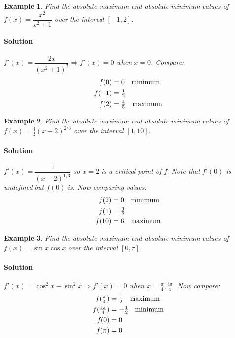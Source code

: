 \documentclass[letterpaper, 11pt, openany]{book}
\theoremstyle{mytheoremstyle}
\theoremstyle{myexamplestyle}
\newtheorem{example}{Example}[section]
\newenvironment{solution}{\paragraph{\sffamily \smaller \fontseries{b}\selectfont Solution}}{\hfill\faSquare}
\begin{document}
\begin{example}\label{absmaxmin-rational}
    Find the absolute maximum and absolute minimum values of $f(x) = \dfrac{x^{2}}{x^{2}+1}$ over the interval $[-1, 2]$.
    \begin{solution}
        $f'(x) = \dfrac{2x}{(x^{2}+ 1)^{2}} \Rightarrow f'(x) = 0$ when $x=0$. Compare:
        \begin{align*}
            f(0) &= 0\text{\quad minimum}\\
            f(-1) &= \tfrac{1}{2}\\
            f(2) &= \tfrac{4}{5}\text{\quad maximum}
        \end{align*}
    \end{solution}
\end{example}

\begin{example}\label{absmaxmin-cuberoot}
    Find the absolute maximum and absolute minimum values of $f(x) = \frac{3}{2} (x-2)^{2/3}$ over the interval $[1, 10]$.
    \begin{solution}
        $f'(x) = \dfrac{1}{(x-2)^{1/3}}$ so $x=2$ is a critical point of $f$. Note that $f'(0)$ is undefined but $f(0)$ is. Now comparing values:
        \begin{align*}
            f(2) &= 0 \text{\quad minimum}\\
            f(1) &= \tfrac{3}{2} \\
            f(10) &= 6 \text{\quad maximum}
        \end{align*}
    \end{solution}
\end{example}

\begin{example}\label{absmaxmin-trig}
    Find the absolute maximum and absolute minimum values of $f(x) = \sin x \cos x$ over the interval $[0, \pi]$.
    \begin{solution}
        $f'(x) = \cos^{2} x - \sin^{2} x \Rightarrow f'(x) = 0$ when $x = \frac{\pi}{4}, \frac{3\pi}{4}$. Now compare:
        \begin{align*}
            f(\tfrac{\pi}{4}) &= \tfrac{1}{2} \text{\quad maximum}\\
            f(\tfrac{3\pi}{4}) &= -\tfrac{1}{2} \text{\quad minimum}\\
            f(0) &= 0\\
            f(\pi) &= 0
        \end{align*}
    \end{solution}
\end{example}
\end{document}
